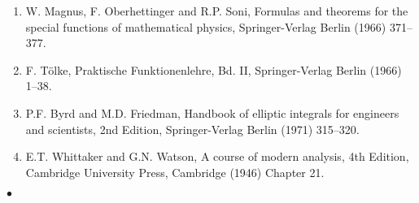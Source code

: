 \Refer
\begin{enumerate}
\item W. Magnus, F. Oberhettinger and R.P. Soni, Formulas and theorems
for the special functions of mathematical physics, Springer-Verlag
Berlin (1966) 371--377.
\item F. T\"olke, Praktische Funktionenlehre, Bd. II, Springer-Verlag
Berlin (1966) 1--38.
\item P.F. Byrd and M.D. Friedman, Handbook of elliptic integrals for
engineers and scientists, 2nd Edition, Springer-Verlag Berlin (1971)
315--320.
\item E.T. Whittaker and G.N. Watson, A course of modern analysis,
4th Edition, Cambridge University Press, Cambridge (1946) Chapter 21.
\end{enumerate}
$\bullet$
